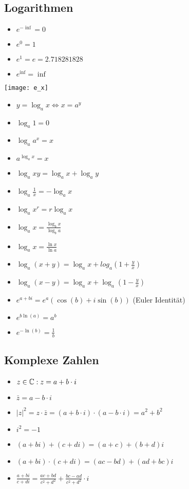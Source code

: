 \subsection{Logarithmen}
\begin{itemize}[leftmargin=*]
  \item $e^{-\inf} = 0$
  \item $e^0 = 1$
  \item $e^1 = e =  2.718281828$
  \item $e^{\inf} = \inf$
\end{itemize}
\texttt{[image: e\_x]}
\begin{itemize}[leftmargin=*]
  \item $y = \log_a x \Leftrightarrow x = a^y$
  \item $\log_a 1 = 0$
  \item $\log_a a^x = x$
  \item $a^{\log_a x} = x $
  \item $\log_a xy = \log_a x + \log_a y$
  \item $\log_a \frac{1}{x} = - \log_a x$
  \item $\log_a x^r = r \log_a x$
  \item $\log_a x = \frac{\log_b x}{\log_b a}$
  \item $\log_a x = \frac{\ln x}{\ln a}$
  \item $\log_a (x+y) = \log_a x + log_a (1 + \frac{y}{x})$
  \item $\log_a (x-y) = \log_a x + \log_a (1- \frac{y}{x})$
  \item $e^{a+bi} = e^a(\cos(b) + i \sin(b))$ (Euler Identität)
  \item $e^{b \ln(a)} = a^b$
  \item $ e^{-\ln(b)} = \frac{1}{b}$
\end{itemize}

\subsection{Komplexe Zahlen}
\begin{itemize}[leftmargin=*]
	\item $z \in \mathbb{C}: z = a + b\cdot i$
	\item $\bar{z} = a - b\cdot i$
	\item $|z|^2 = z \cdot \bar{z} = (a + b\cdot i) \cdot (a - b\cdot i) = a^2 + b^2$
	\item $i^2 = -1$
	\item $(a + bi) + (c + di) = (a + c) + (b + d)i$
	\item $(a + bi) \cdot (c + di) = (ac - bd) + (ad + bc)i$
	\item $\frac{a + bi}{c + di} = \frac{ac + bd}{c^2 + d^2} + \frac{bc - ad}{c^2 + d^2}\cdot i$
\end{itemize}

